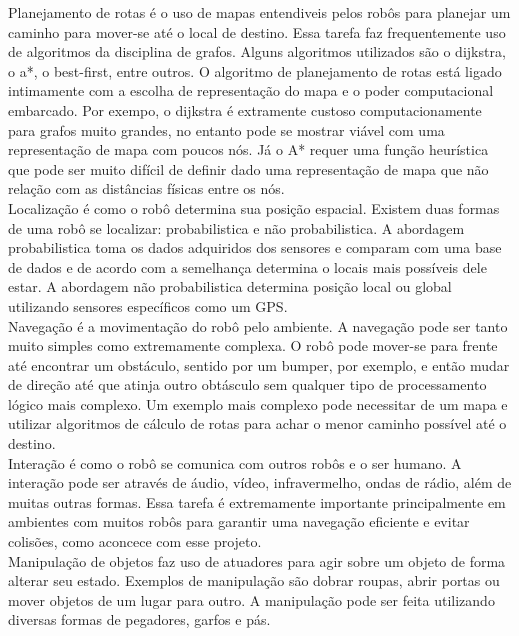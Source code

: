 \documentclass[12pt]{report}
\begin{document}
Planejamento de rotas é o uso de mapas entendiveis pelos robôs para planejar um caminho para mover-se até o local de destino. Essa tarefa faz frequentemente uso de algoritmos da disciplina de grafos. Alguns algoritmos utilizados são o dijkstra, o a*, o best-first, entre outros. O algoritmo de planejamento de rotas está ligado intimamente com a escolha de representação do mapa e o poder computacional embarcado. Por exempo, o dijkstra é extramente custoso computacionamente para grafos muito grandes, no entanto pode se mostrar viável com uma representação de mapa com poucos nós. Já o A* requer uma função heurística que pode ser muito difícil de definir dado uma representação de mapa que não relação com as distâncias físicas entre os nós.\\

Localização é como o robô determina sua posição espacial. Existem duas formas de uma robô se localizar: probabilistica e não probabilistica. A abordagem probabilistica toma os dados adquiridos dos sensores e comparam com uma base de dados e de acordo com a semelhança determina o locais mais possíveis dele estar. A abordagem não probabilistica determina posição local ou global utilizando sensores específicos como um GPS.\\

Navegação é a movimentação do robô pelo ambiente. A navegação pode ser tanto muito simples como extremamente complexa. O robô pode mover-se para frente até encontrar um obstáculo, sentido por um bumper, por exemplo, e então mudar de direção até que atinja outro obtásculo sem qualquer tipo de processamento lógico mais complexo. Um exemplo mais complexo pode necessitar de um mapa e utilizar algoritmos de cálculo de rotas para achar o menor caminho possível até o destino.\\

Interação é como o robô se comunica com outros robôs e o ser humano. A interação pode ser através de áudio, vídeo, infravermelho, ondas de rádio, além de muitas outras formas. Essa tarefa é extremamente importante principalmente em ambientes com muitos robôs para garantir uma navegação eficiente e evitar colisões, como aconcece com esse projeto.\\

Manipulação de objetos faz uso de atuadores para agir sobre um objeto de forma alterar seu estado. Exemplos de manipulação são dobrar roupas, abrir portas ou mover objetos de um lugar para outro. A manipulação pode ser feita utilizando diversas formas de pegadores, garfos e pás. \\
\end{document}
